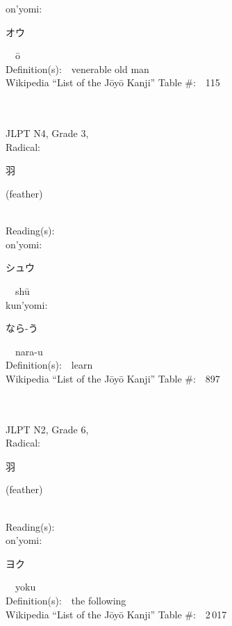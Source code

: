 \begin{multicols}{2}
{\hspace*{1em}}on'yomi:\ \ \\
{\hspace*{2em}}{\begin{CJK}{UTF8}{min} オウ \end{CJK}}\ \ \=o\ \ \\
Definition(s):\ \ venerable old man \\
Wikipedia ``List of the J\=oy\=o Kanji'' Table \#:\ \ 115 \\
\ \ \\
{\fontsize{34pt}{40pt}  }\ \ \\  %
{JLPT N4, Grade 3, \\Radical:\ \ {\begin{CJK}{UTF8}{min} 羽 \end{CJK}} (feather) } \\
Reading(s):\ \ \\
{\hspace*{1em}}on'yomi:\ \ \\
{\hspace*{2em}}{\begin{CJK}{UTF8}{min} シュウ \end{CJK}}\ \ sh\=u\ \ \\
{\hspace*{1em}}kun'yomi:\ \ \\
{\hspace*{2em}}{\begin{CJK}{UTF8}{min} なら-う \end{CJK}}\ \ nara-u\ \ \\
Definition(s):\ \ learn \\
Wikipedia ``List of the J\=oy\=o Kanji'' Table \#:\ \ 897 \\
\ \ \\
{\fontsize{34pt}{40pt}  }\ \ \\  %
{JLPT N2, Grade 6, \\Radical:\ \ {\begin{CJK}{UTF8}{min} 羽 \end{CJK}} (feather) } \\
Reading(s):\ \ \\
{\hspace*{1em}}on'yomi:\ \ \\
{\hspace*{2em}}{\begin{CJK}{UTF8}{min} ヨク \end{CJK}}\ \ yoku\ \ \\
Definition(s):\ \ the following \\
Wikipedia ``List of the J\=oy\=o Kanji'' Table \#:\ \ 2\,017 \\
\ \ \\
\end{multicols}


